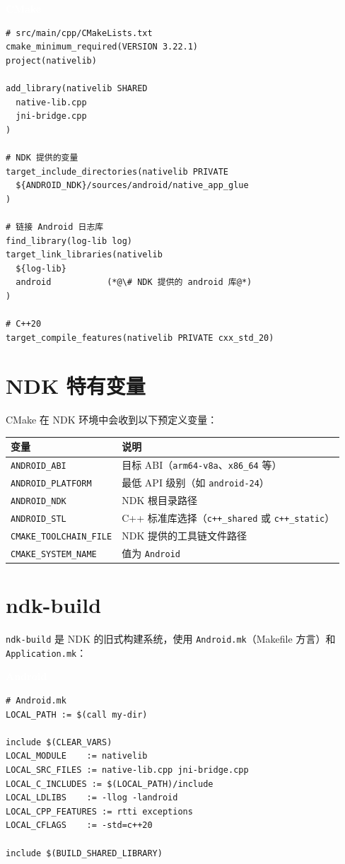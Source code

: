 \documentclass[12pt,a4paper,fontset=fandol]{ctexbook}
\newcommand{\Tp}[1]{\texttt{#1}}
\newcommand{\cmakelabel}{%
  \noindent\begin{tcolorbox}[sharp corners,colback=cmakeheadbg,colframe=cmakeheadbg,
    left=6pt,right=6pt,top=2pt,bottom=2pt,boxrule=0pt]
  \textcolor{white}{\small\bfseries\sffamily CMake}\end{tcolorbox}%
}
\newcommand{\androidlabel}{%
  \noindent\begin{tcolorbox}[sharp corners,colback=androidheadbg!80!black,colframe=androidheadbg!80!black,
    left=6pt,right=6pt,top=2pt,bottom=2pt,boxrule=0pt]
  \textcolor{white}{\small\bfseries\sffamily Android}\end{tcolorbox}%
}
\begin{document}
\cmakelabel
\begin{lstlisting}[style=cmakestyle]
# src/main/cpp/CMakeLists.txt
cmake_minimum_required(VERSION 3.22.1)
project(nativelib)

add_library(nativelib SHARED
  native-lib.cpp
  jni-bridge.cpp
)

# NDK 提供的变量
target_include_directories(nativelib PRIVATE
  ${ANDROID_NDK}/sources/android/native_app_glue
)

# 链接 Android 日志库
find_library(log-lib log)
target_link_libraries(nativelib
  ${log-lib}
  android           (*@\# NDK 提供的 android 库@*)
)

# C++20
target_compile_features(nativelib PRIVATE cxx_std_20)
\end{lstlisting}

\section{NDK 特有变量}

CMake 在 NDK 环境中会收到以下预定义变量：

\begin{guideline}[title=NDK CMake 变量]
\begin{tabularx}{\textwidth}{l>{\raggedright\arraybackslash}X}
\toprule
\textbf{变量} & \textbf{说明} \\
\midrule
\Tp{ANDROID\_ABI} & 目标 ABI（\Tp{arm64-v8a}、\Tp{x86\_64} 等） \\
\Tp{ANDROID\_PLATFORM} & 最低 API 级别（如 \Tp{android-24}） \\
\Tp{ANDROID\_NDK} & NDK 根目录路径 \\
\Tp{ANDROID\_STL} & C++ 标准库选择（\Tp{c++\_shared} 或 \Tp{c++\_static}） \\
\Tp{CMAKE\_TOOLCHAIN\_FILE} & NDK 提供的工具链文件路径 \\
\Tp{CMAKE\_SYSTEM\_NAME} & 值为 \Tp{Android} \\
\bottomrule
\end{tabularx}
\end{guideline}

\section{ndk-build}

{\sloppy\Tp{ndk-build} 是 NDK 的旧式构建系统，使用 \Tp{Android.mk}（Makefile 方言）和 \Tp{Application.\allowbreak{}mk}：\par}

\androidlabel
\begin{lstlisting}[style=bashstyle]
# Android.mk
LOCAL_PATH := $(call my-dir)

include $(CLEAR_VARS)
LOCAL_MODULE    := nativelib
LOCAL_SRC_FILES := native-lib.cpp jni-bridge.cpp
LOCAL_C_INCLUDES := $(LOCAL_PATH)/include
LOCAL_LDLIBS    := -llog -landroid
LOCAL_CPP_FEATURES := rtti exceptions
LOCAL_CFLAGS    := -std=c++20

include $(BUILD_SHARED_LIBRARY)
\end{lstlisting}
\end{document}
